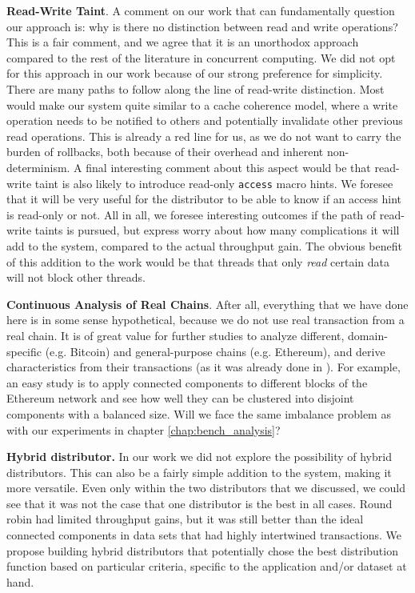 \textbf{Read-Write Taint}. A comment on our work that can fundamentally question our approach is:
why is there no distinction between read and write operations? This is a fair comment, and we agree
that it is an unorthodox approach compared to the rest of the literature in concurrent computing. We
did not opt for this approach in our work because of our strong preference for simplicity. There are
many paths to follow along the line of read-write distinction. Most would make our system quite
similar to a cache coherence model, where a write operation needs to be notified to others and
potentially invalidate other previous read operations. This is already a red line for us, as we do
not want to carry the burden of rollbacks, both because of their overhead and inherent
non-determinism. A final interesting comment about this aspect would be that read-write taint is
also likely to introduce read-only \texttt{access} macro hints. We foresee that it will be very
useful for the distributor to be able to know if an access hint is read-only or not. All in all, we
foresee interesting outcomes if the path of read-write taints is pursued, but express worry about
how many complications it will add to the system, compared to the actual throughput gain. The
obvious benefit of this addition to the work would be that threads that only \textit{read} certain
data will not block other threads.

\textbf{Continuous Analysis of Real Chains}. After all, everything that we have done here is in some
sense hypothetical, because we do not use real transaction from a real chain. It is of great value
for further studies to analyze different, domain-specific (e.g. Bitcoin) and general-purpose chains
(e.g. Ethereum), and derive characteristics from their transactions (as it was already done in
\cite{saraphEmpiricalStudySpeculative2019}). For example, an easy study is to apply connected
components to different blocks of the Ethereum network and see how well they can be clustered into
disjoint components with a balanced size. Will we face the same imbalance problem as with our
experiments in chapter \ref{chap:bench_analysis}?

\textbf{Hybrid distributor.} In our work we did not explore the possibility of hybrid distributors.
This can also be a fairly simple addition to the system, making it more versatile. Even only within
the two distributors that we discussed, we could see that it was not the case that one distributor
is the best in all cases. Round robin had limited throughput gains, but it was still better than the
ideal connected components in data sets that had highly intertwined transactions. We propose
building hybrid distributors that potentially chose the best distribution function based on
particular criteria, specific to the application and/or dataset at hand.

